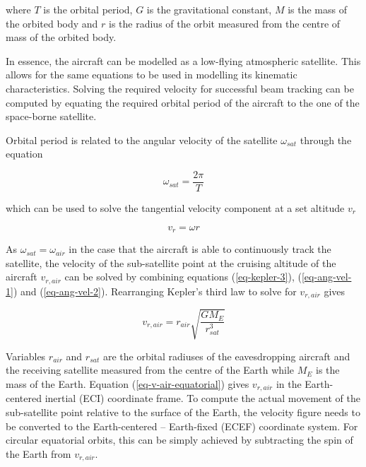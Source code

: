 \documentclass[english, 12pt, a4paper, elec, utf8, a-1b, online]{aaltothesis}
\begin{document}
where $T$ is the orbital period, $G$ is the gravitational constant, $M$ is the mass of the orbited body and $r$ is the radius of the orbit measured from the centre of mass of the orbited body.

In essence, the aircraft can be modelled as a low-flying atmospheric satellite.
This allows for the same equations to be used in modelling its kinematic characteristics.
Solving the required velocity for successful beam tracking can be computed by equating the required orbital period of the aircraft to the one of the space-borne satellite.

Orbital period is related to the angular velocity of the satellite $\omega_{sat}$ through the equation

\begin{equation} \label{eq-ang-vel-1}
  \omega_{sat} = \frac{2\pi}{T}
\end{equation}

\noindent
which can be used to solve the tangential velocity component at a set altitude $v_r$

\begin{equation} \label{eq-ang-vel-2}
  v_r = \omega r
\end{equation}

\noindent
As $\omega_{sat} = \omega_{air}$ in the case that the aircraft is able to continuously track the satellite, the velocity of the sub-satellite point at the cruising altitude of the aircraft $v_{r, air}$ can be solved by combining equations (\ref{eq-kepler-3}), (\ref{eq-ang-vel-1}) and (\ref{eq-ang-vel-2}).
Rearranging Kepler's third law to solve for $v_{r, air}$ gives

\begin{equation} \label{eq-v-air-equatorial}
  v_{r, air} = r_{air} \sqrt{\frac{G M_E}{r_{sat}^3}}
\end{equation}

\noindent
Variables $r_{air}$ and $r_{sat}$ are the orbital radiuses of the eavesdropping aircraft and the receiving satellite measured from the centre of the Earth while $M_E$ is the mass of the Earth.
Equation (\ref{eq-v-air-equatorial}) gives $v_{r, air}$ in the Earth-centered inertial (ECI) coordinate frame.
To compute the actual movement of the sub-satellite point relative to the surface of the Earth, the velocity figure needs to be converted to the Earth-centered -- Earth-fixed (ECEF) coordinate system.
For circular equatorial orbits, this can be simply achieved by subtracting the spin of the Earth from $v_{r, air}$.
\end{document}
